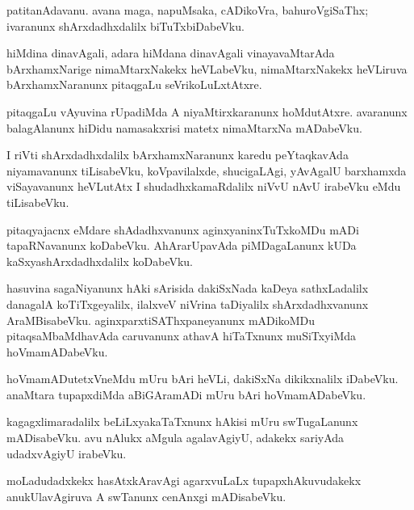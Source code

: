 \documentclass{article}
\begin{document}
\begin{mn}%
patitanAdavanu. avana maga, napuMsaka, cADikoVra, bahuroVgiSaThx;
ivaranunx shArxdadhxdalilx biTuTxbiDabeVku.
\end{mn}

\begin{mn}
hiMdina dinavAgali, adara hiMdana dinavAgali vinayavaMtarAda
bArxhamxNarige nimaMtarxNakekx heVLabeVku, nimaMtarxNakekx heVLiruva
bArxhamxNaranunx pitaqgaLu seVrikoLuLxtAtxre.
\end{mn}

\begin{mn}
pitaqgaLu vAyuvina rUpadiMda A niyaMtirxkaranunx
hoMdutAtxre. avaranunx balagAlanunx hiDidu namasakxrisi matetx
nimaMtarxNa mADabeVku.
\end{mn}

\begin{mn}
I riVti shArxdadhxdalilx bArxhamxNaranunx karedu peYtaqkavAda
niyamavanunx tiLisabeVku, koVpavilalxde, shucigaLAgi, yAvAgalU
barxhamxda viSayavanunx heVLutAtx I shudadhxkamaRdalilx niVvU nAvU
irabeVku eMdu tiLisabeVku.
\end{mn}

\begin{mn}
pitaqyajacnx eMdare shAdadhxvanunx aginxyaninxTuTxkoMDu mADi
tapaRNavanunx koDabeVku. AhArarUpavAda piMDagaLanunx kUDa
kaSxyashArxdadhxdalilx koDabeVku.
\end{mn}

\begin{mn}%
hasuvina sagaNiyanunx hAki sArisida dakiSxNada kaDeya sathxLadalilx
danagalA koTiTxgeyalilx, ilalxveV niVrina taDiyalilx shArxdadhxvanunx
AraMBisabeVku. aginxparxtiSAThxpaneyanunx mADikoMDu pitaqsaMbaMdhavAda
caruvanunx athavA hiTaTxnunx muSiTxyiMda hoVmamADabeVku.
\end{mn}

\begin{mn}
hoVmamADutetxVneMdu mUru bAri heVLi, dakiSxNa dikikxnalilx
iDabeVku. anaMtara tupapxdiMda aBiGAramADi mUru bAri hoVmamADabeVku.
\end{mn}

\begin{mn}
kagagxlimaradalilx beLiLxyakaTaTxnunx hAkisi mUru swTugaLanunx
mADisabeVku. avu nAlukx aMgula agalavAgiyU, adakekx sariyAda
udadxvAgiyU irabeVku.
\end{mn}

\begin{mn}
moLadudadxkekx hasAtxkAravAgi agarxvuLaLx tupapxhAkuvudakekx
anukUlavAgiruva A swTanunx cenAnxgi mADisabeVku.
\end{mn}
\end{document}
